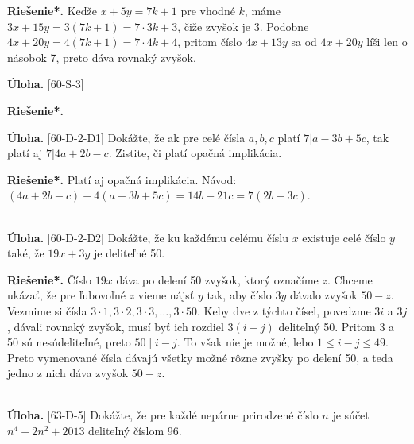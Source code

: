 \documentclass[11pt,a4paper,oneside,final]{book}
\newcommand{\ul}{\textbf{Úloha.} }
\newcommand{\rieh}{\textbf{Riešenie*.} }
\begin{document}
\rieh Keďže $x + 5y = 7k + 1$ pre vhodné $k$, máme $3x + 15y = 3(7k + 1) = 7 \cdot 3k + 3$, čiže zvyšok je 3. Podobne $4x + 20y = 4(7k + 1) = 7 \cdot 4k + 4$, pritom číslo $4x + 13y$ sa od $4x + 20y$ líši len o násobok 7, preto dáva rovnaký zvyšok.\\
\begin{tcolorbox}[breakable,notitle,boxrule=0pt,colback=light-gray,colframe=light-gray]\ul [60-S-3] 

\end{tcolorbox}

\rieh \\


\begin{tcolorbox}[breakable,notitle,boxrule=0pt,colback=light-gray,colframe=light-gray]\ul [60-D-2-D1] Dokážte, že ak pre celé čísla $a, b, c$ platí $7 | a - 3b + 5c$, tak platí aj $7 | 4a + 2b - c$. Zistite, či platí opačná implikácia.

\end{tcolorbox}

\rieh Platí aj opačná implikácia. Návod: $(4a + 2b - c)- 4(a - 3b + 5c) = 14b - 21c = 7(2b - 3c)$.\\
\\
\begin{tcolorbox}[breakable,notitle,boxrule=0pt,colback=light-gray,colframe=light-gray]\ul [60-D-2-D2] Dokážte, že ku každému celému číslu $x$ existuje celé číslo $y$ také, že $19x+3y$ je deliteľné 50.

\end{tcolorbox}

\rieh Číslo $19x$ dáva po delení 50 zvyšok, ktorý označíme $z$. Chceme ukázať, že pre ľubovoľné $z$ vieme nájsť $y$ tak, aby číslo $3y$ dávalo zvyšok $50 - z$. Vezmime si čísla $3 \cdot 1, 3 \cdot 2, 3 \cdot 3, \ldots , 3 \cdot 50$. Keby dve z týchto čísel, povedzme $3i$ a $3j$, dávali rovnaký zvyšok, musí byť ich rozdiel $3(i - j)$ deliteľný 50. Pritom 3 a 50 sú nesúdeliteľné, preto $50 \mid i - j$. To však nie je možné, lebo $1 \leq i - j \leq 49$. Preto vymenované čísla dávajú všetky možné rôzne zvyšky po delení 50, a teda jedno z nich dáva zvyšok $50 - z$.\\
\\
\begin{tcolorbox}[breakable,notitle,boxrule=0pt,colback=light-gray,colframe=light-gray]\ul [63-D-5]
Dokážte, že pre každé nepárne prirodzené číslo $n$ je súčet $n^4 + 2n^2 + 2 013$ deliteľný číslom 96.

\end{tcolorbox}
\end{document}
